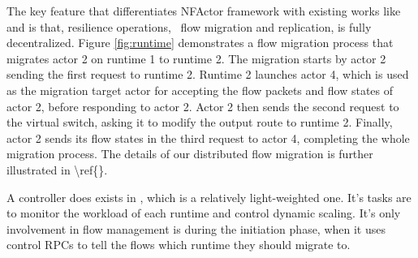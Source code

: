 The key feature that differentiates NFActor framework with existing works like \cite{gember2015opennf} and \cite{rajagopalan2013split} is that, resilience operations, \ie~flow migration and replication, is fully decentralized. Figure \ref{fig:runtime} demonstrates a flow migration process that migrates actor 2 on runtime 1 to runtime 2. \ac{The migration starts by actor 2 sending the first request to runtime 2. Runtime 2 launches actor 4, which is used as the migration target actor for accepting the flow packets and flow states of actor 2, before responding to actor 2. Actor 2 then sends the second request to the virtual switch, asking it to modify the output route to runtime 2. Finally, actor 2 sends its flow states in the third request to actor 4, completing the whole migration process. The details of our distributed flow migration is further illustrated in \ref{}.} 

A controller does exists in \nfactor, which is a relatively light-weighted one. It's tasks are to monitor the workload of each runtime and control dynamic scaling. It's only involvement in flow management is during the initiation phase, when it uses control RPCs to tell the flows which runtime they should migrate to.
